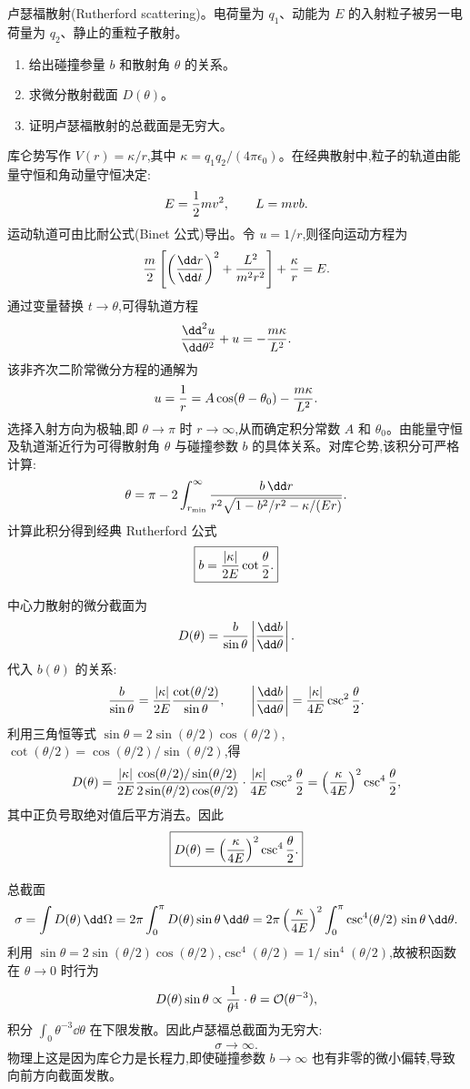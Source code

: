 \begin{question}
卢瑟福散射(Rutherford scattering)。电荷量为 $q_1$、动能为 $E$ 的入射粒子被另一电荷量为 $q_2$、静止的重粒子散射。
\begin{enumerate}
\item 给出碰撞参量 $b$ 和散射角 $\theta$ 的关系。
\item 求微分散射截面 $D(\theta)$。
\item 证明卢瑟福散射的总截面是无穷大。
\end{enumerate}
\end{question}
\begin{solution}
库仑势写作 $V(r)=\kappa/r$,其中 $\kappa=q_1q_2/(4\pi\epsilon_0)$。在经典散射中,粒子的轨道由能量守恒和角动量守恒决定:
\[
E={1\over2}mv^2,\qquad L=mvb.
\]
运动轨道可由比耐公式(Binet 公式)导出。令 $u=1/r$,则径向运动方程为
\[
{m\over2}\left[\left({\dd r\over\dd t}\right)^2+{L^2\over m^2r^2}\right]+{\kappa\over r}=E.
\]
通过变量替换 $t\to\theta$,可得轨道方程
\[
{\dd^2 u\over\dd\theta^2}+u=-{m\kappa\over L^2}.
\]
该非齐次二阶常微分方程的通解为
\[
u={1\over r}=A\cos(\theta-\theta_0)-{m\kappa\over L^2}.
\]
选择入射方向为极轴,即 $\theta\to\pi$ 时 $r\to\infty$,从而确定积分常数 $A$ 和 $\theta_0$。由能量守恒及轨道渐近行为可得散射角 $\theta$ 与碰撞参数 $b$ 的具体关系。对库仑势,该积分可严格计算:
\[
\theta=\pi-2\int_{r_{\min}}^{\infty}{b\,\dd r\over r^2\sqrt{1-b^2/r^2-\kappa/(Er)}}.
\]
计算此积分得到经典 Rutherford 公式
\[
\boxed{b={|\kappa|\over2E}\cot{\theta\over2}.}
\]

中心力散射的微分截面为
\[
D(\theta)={b\over\sin\theta}\left|{\dd b\over\dd\theta}\right|.
\]
代入 $b(\theta)$ 的关系:
\[
{b\over\sin\theta}={|\kappa|\over2E}{\cot(\theta/2)\over\sin\theta},
\qquad
\left|{\dd b\over\dd\theta}\right|={|\kappa|\over4E}\csc^2{\theta\over2}.
\]
利用三角恒等式 $\sin\theta=2\sin(\theta/2)\cos(\theta/2)$,$\cot(\theta/2)=\cos(\theta/2)/\sin(\theta/2)$,得
\[
D(\theta)={|\kappa|\over2E}{\cos(\theta/2)/\sin(\theta/2)\over2\sin(\theta/2)\cos(\theta/2)}\cdot{|\kappa|\over4E}\csc^2{\theta\over2}
=\left({\kappa\over4E}\right)^2\csc^4{\theta\over2},
\]
其中正负号取绝对值后平方消去。因此
\[
\boxed{D(\theta)=\left({\kappa\over4E}\right)^2\csc^4{\theta\over2}.}
\]

总截面
\[
\sigma=\int D(\theta)\,\dd\Omega=2\pi\int_0^\pi D(\theta)\sin\theta\,\dd\theta
=2\pi\left({\kappa\over4E}\right)^2\int_0^\pi{\csc^4(\theta/2)\,\sin\theta}\,\dd\theta.
\]
利用 $\sin\theta=2\sin(\theta/2)\cos(\theta/2)$,$\csc^4(\theta/2)=1/\sin^4(\theta/2)$,故被积函数在 $\theta\to0$ 时行为
\[
D(\theta)\sin\theta\propto{1\over\theta^4}\cdot\theta={\cal O}(\theta^{-3}),
\]
积分 $\int_0\theta^{-3}\dd\theta$ 在下限发散。因此卢瑟福总截面为无穷大:
\[
\boxed{\sigma\to\infty.}
\]
物理上这是因为库仑力是长程力,即使碰撞参数 $b\to\infty$ 也有非零的微小偏转,导致向前方向截面发散。
\end{solution}

